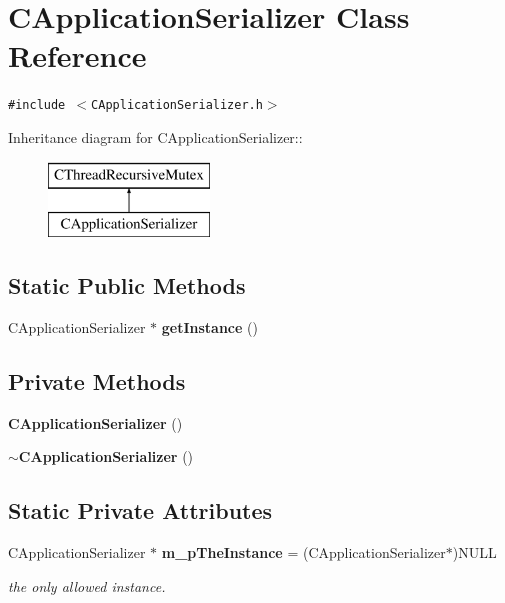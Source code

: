 \section{CApplication\-Serializer  Class Reference}
\label{classCApplicationSerializer}
{\tt \#include $<$CApplication\-Serializer.h$>$}

Inheritance diagram for CApplication\-Serializer::\begin{figure}[H]
\begin{center}
\leavevmode
\includegraphics[height=2cm]{classCApplicationSerializer}
\end{center}
\end{figure}
\subsection*{Static Public Methods}
\begin{CompactItemize}
\item 
CApplication\-Serializer $\ast$ {\bf get\-Instance} ()
\end{CompactItemize}
\subsection*{Private Methods}
\begin{CompactItemize}
\item 
{\bf CApplication\-Serializer} ()
\item 
{\bf $\sim$CApplication\-Serializer} ()
\end{CompactItemize}
\subsection*{Static Private Attributes}
\begin{CompactItemize}
\item 
CApplication\-Serializer $\ast$ {\bf m\_\-p\-The\-Instance} = (CApplication\-Serializer$\ast$)NULL
\begin{CompactList}\small\item\em the only allowed instance.\item\end{CompactList}\end{CompactItemize}


